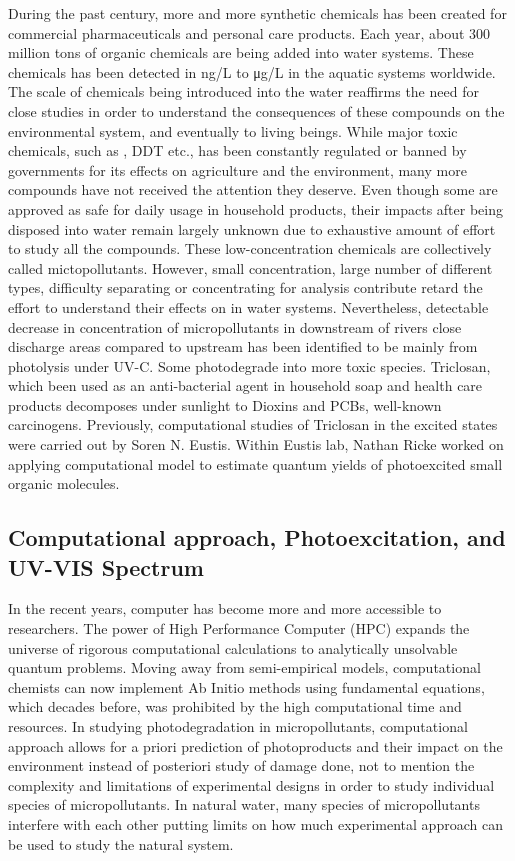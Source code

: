 \documentclass[
journal=jpcbfk, %
manuscript=article]{achemso}
\begin{document}
During the past century, more and more synthetic chemicals has been created for commercial pharmaceuticals and personal care products. Each year, about 300 million tons of organic chemicals are being added into water systems.\cite{Schwarzenbach2006} These chemicals has been detected in ng/L to μg/L in the aquatic systems worldwide.\cite{Monteiro2010} The scale of chemicals being introduced into the water reaffirms the need for close studies in order to understand the consequences of these compounds on the environmental system, and eventually to living beings. While major toxic chemicals, such as , DDT etc., has been constantly regulated or banned by governments for its effects on agriculture and the environment, many more compounds have not received the attention they deserve. Even though some are approved as safe for daily usage in household products, their impacts after being disposed into water remain largely unknown due to exhaustive amount of effort to study all the compounds. These low-concentration chemicals are collectively called mictopollutants. However, small concentration, large number of different types, difficulty separating or concentrating for analysis contribute retard the effort to understand their effects on in water systems. Nevertheless, detectable decrease in concentration of micropollutants in downstream of rivers close discharge areas compared to upstream has been identified to be mainly from photolysis under UV-C.\cite{Conley2008,Daneshvar2010,Bonvin2011,Carlson2015} Some photodegrade into more toxic species. Triclosan, which been used as an anti-bacterial agent in household soap and health care products decomposes under sunlight to Dioxins and PCBs, well-known carcinogens.\cite{Bedoux2012} Previously, computational studies of Triclosan in the excited states were carried out by Soren N. Eustis.\cite{Kliegman2013} Within Eustis lab, Nathan Ricke worked on applying computational model to estimate quantum yields of photoexcited small organic molecules.\cite{Ricke2014} 

\subsection{Computational approach, Photoexcitation, and UV-VIS Spectrum}
In the recent years, computer has become more and more accessible to researchers.\cite{Dykstra2011} The power of High Performance Computer (HPC) expands the universe of rigorous computational calculations to analytically unsolvable quantum problems. Moving away from semi-empirical models, computational chemists can now implement Ab Initio methods using fundamental equations, which decades before, was prohibited by the high computational time and resources. In studying photodegradation in micropollutants, computational approach allows for a priori prediction of photoproducts and their impact on the environment instead of posteriori study of damage done, not to mention the complexity and limitations of experimental designs in order to study individual species of micropollutants. In natural water, many species of micropollutants interfere with each other putting limits on how much experimental approach can be used to study the natural system. 
\end{document}

